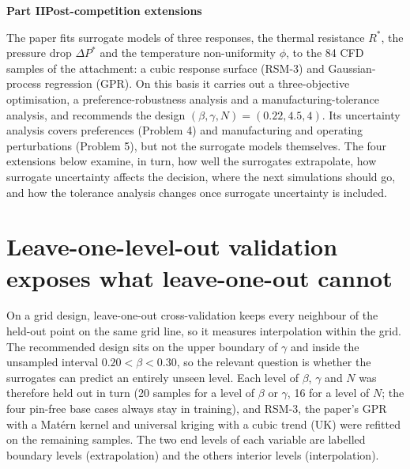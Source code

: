 \clearpage
{}

\setcounter{page}{1}
\begin{center}{\Large\bfseries Part II\quad Post-competition extensions}\end{center}

The paper fits surrogate models of three responses, the thermal resistance $R^*$, the pressure drop $\Delta P^*$ and the temperature non-uniformity $\phi$, to the 84 CFD samples of the attachment: a cubic response surface (RSM-3) and Gaussian-process regression (GPR). On this basis it carries out a three-objective optimisation, a preference-robustness analysis and a manufacturing-tolerance analysis, and recommends the design $(\beta,\gamma,N)=(0.22, 4.5, 4)$. Its uncertainty analysis covers preferences (Problem 4) and manufacturing and operating perturbations (Problem 5), but not the surrogate models themselves. The four extensions below examine, in turn, how well the surrogates extrapolate, how surrogate uncertainty affects the decision, where the next simulations should go, and how the tolerance analysis changes once surrogate uncertainty is included.

\section{Leave-one-level-out validation exposes what leave-one-out cannot}

On a grid design, leave-one-out cross-validation keeps every neighbour of the held-out point on the same grid line, so it measures interpolation within the grid. The recommended design sits on the upper boundary of $\gamma$ and inside the unsampled interval $0.20<\beta<0.30$, so the relevant question is whether the surrogates can predict an entirely unseen level. Each level of $\beta$, $\gamma$ and $N$ was therefore held out in turn (20 samples for a level of $\beta$ or $\gamma$, 16 for a level of $N$; the four pin-free base cases always stay in training), and RSM-3, the paper's GPR with a Matérn kernel and universal kriging with a cubic trend (UK)\cite{cressie1993} were refitted on the remaining samples. The two end levels of each variable are labelled boundary levels (extrapolation) and the others interior levels (interpolation).


